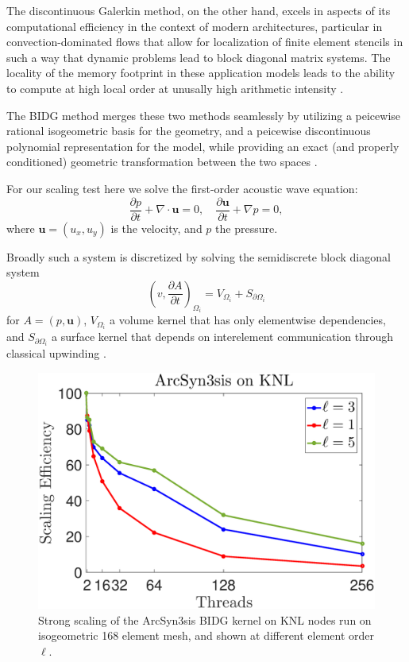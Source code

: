The discontinuous Galerkin method, on the other hand, excels in aspects of its computational efficiency in the context of modern architectures, particular in convection-dominated flows that allow for localization of finite element stencils in such a way that dynamic problems lead to block diagonal matrix systems.  The locality of the memory footprint in these application models leads to the ability to compute at high local order at unusally high arithmetic intensity \cite{Klöckner2009786}.

The BIDG method merges these two methods seamlessly by utilizing a peicewise rational isogeometric basis for the geometry, and a peicewise discontinuous polynomial representation for the model, while providing an exact (and properly conditioned) geometric transformation between the two spaces  \cite{Michoski2016658}.

For our scaling test here we solve the first-order acoustic wave equation: \begin{equation} \label{awe} \frac{\partial p}{\partial t} + \nabla\cdot \boldsymbol{u} = 0, \quad  \frac{\partial\boldsymbol{u}}{\partial t} + \nabla p = 0, \end{equation} where $\boldsymbol{u}=(u_x,u_y)$ is the velocity, and $p$ the pressure.

Broadly such a system is discretized by solving the semidiscrete block diagonal system \[ \left( v, \frac{ \partial A}{\partial t} \right)_{\Omega_{i}}= V_{\Omega_{i}}+S_{\partial\Omega_{i}} \] for $A = (p,\boldsymbol{u})$, $V_{\Omega_{i}}$ a volume kernel that has only elementwise dependencies, and $S_{\partial\Omega_{i}}$ a surface kernel that depends on interelement communication through classical upwinding \cite{Michoski2014898}.  


\begin{figure}[h]
\begin{center}
\includegraphics[width=0.95\linewidth]{./bidg_data/scaling_p}
\end{center}
\vspace*{-.5cm}
\caption{Strong scaling of the ArcSyn3sis BIDG kernel on KNL nodes run on isogeometric 168 element mesh, and shown at different element order $\ell$.}
\label{fig:bidg_scaling}
\end{figure}


